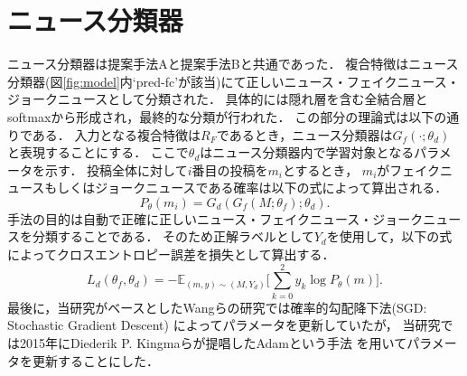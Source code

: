 \section{ニュース分類器}
%
ニュース分類器は提案手法Aと提案手法Bと共通であった．
複合特徴はニュース分類器(図\ref{fig:model}内`pred-fc'が該当)にて正しいニュース・フェイクニュース・ジョークニュースとして分類された．
具体的には隠れ層を含む全結合層とsoftmaxから形成され，最終的な分類が行われた．
この部分の理論式は以下の通りである．
入力となる複合特徴は$R_F$であるとき，ニュース分類器は$G_f(\cdot; \theta_d)$と表現することにする．
ここで$\theta_d$はニュース分類器内で学習対象となるパラメータを示す．
投稿全体に対して$i$番目の投稿を$m_i$とするとき，
$m_i$がフェイクニュースもしくはジョークニュースである確率は以下の式によって算出される．
\begin{equation}
    \label{eq:news_classify}
    P_\theta(m_i) = G_d(G_f(M; \theta_f); \theta_d).
\end{equation}
手法の目的は自動で正確に正しいニュース・フェイクニュース・ジョークニュースを分類することである．
そのため正解ラベルとして$Y_d$を使用して，以下の式によってクロスエントロピー誤差を損失として算出する．
\begin{equation}
    \label{eq:cross_entropy}
    L_d(\theta_f, \theta_d) = -\mathbb{E}_{(m,y)\sim(M, Y_{d})}\biggl[\sum_{k=0}^{2} {y_k\log{P_\theta(m)}}\biggr].
\end{equation}
最後に，当研究がベースとしたWangらの研究では確率的勾配降下法(SGD: Stochastic Gradient Descent)
によってパラメータを更新していたが，
当研究では2015年にDiederik P. Kingmaらが提唱したAdamという手法\cite{DBLP:journals/corr/KingmaB14}
を用いてパラメータを更新することにした．
%


